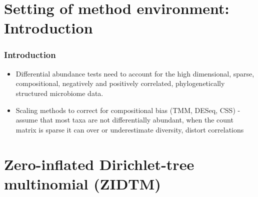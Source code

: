 \documentclass{beamer}
\begin{document}
\section{Setting of method environment: Introduction}
\begin{frame}
\frametitle{Introduction}
   \begin{itemize}
     \item Differential abundance tests need to account for the high dimensional, sparse, compositional, negatively and positively correlated, phylogenetically structured microbiome data.
      \item Scaling methods to correct for compositional bias (TMM, DESeq, CSS) - assume that most taxa are not differentially abundant, when the count matrix is sparse it can over or underestimate diversity, distort correlations
   \end{itemize}
\end{frame}
\section{Zero-inflated Dirichlet-tree multinomial (ZIDTM)}
\end{document}
